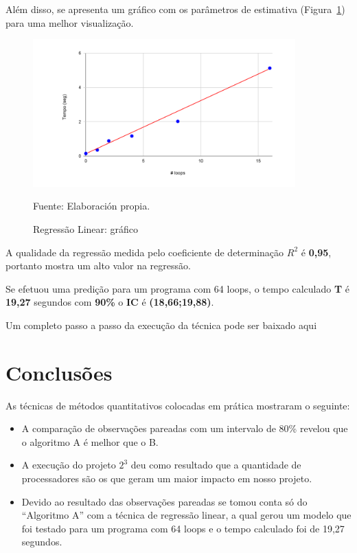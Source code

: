 \documentclass[12pt]{article}
\begin{document}
Além disso, se apresenta um gráfico com os parâmetros de estimativa (Figura~\ref{figure:regressao_graph}) para uma melhor visualização.

\begin{figure}[!ht]
	\begin{center}
		\includegraphics[width=0.9\textwidth]{images/regressao_graph}
	\end{center}
	\begin{center}
		\vskip -0.5cm
		\caption{\label{figure:regressao_graph}
			\small{Regressão Linear: gráfico}}
		{\small{Fuente: Elaboración propia.}}
	\end{center}
\end{figure}

A qualidade da regressão medida pelo coeficiente de determinação ${R^2}$ é \textbf{0,95}, portanto mostra um alto valor na regressão.

Se efetuou uma predição para um programa com 64 loops, o tempo calculado \textbf{T} é \textbf{19,27}  segundos com \textbf{90\%} o \textbf{IC} é \textbf{(18,66;19,88)}.

Um completo passo a passo da execução da técnica pode ser baixado aqui 

\section{Conclusões}

As técnicas de métodos quantitativos colocadas em prática mostraram o seguinte:

\begin{itemize}
	\item A comparação de observações pareadas com um intervalo de 80\% revelou que o algoritmo A é melhor que o B.
	\item A execução do projeto ${2^3}$ deu como resultado que a quantidade de processadores são os que geram um maior impacto em nosso projeto. 
	\item Devido ao resultado das observações pareadas se tomou conta só do ``Algoritmo A'' com a técnica de regressão linear, a qual gerou um modelo que foi testado para um programa com 64 loops e o tempo calculado foi de 19,27 segundos.
\end{itemize}	
\end{document}

